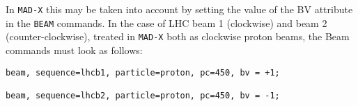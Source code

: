In {\tt MAD-X} this may be taken into account by setting the value of
the BV attribute in the {\tt BEAM} commands. In the case of LHC beam 1
(clockwise) and beam 2 (counter-clockwise), treated in {\tt MAD-X} both
as clockwise proton beams, the Beam commands must look as follows:  

\begin{verbatim}
beam, sequence=lhcb1, particle=proton, pc=450, bv = +1;

beam, sequence=lhcb2, particle=proton, pc=450, bv = -1;
\end{verbatim}



